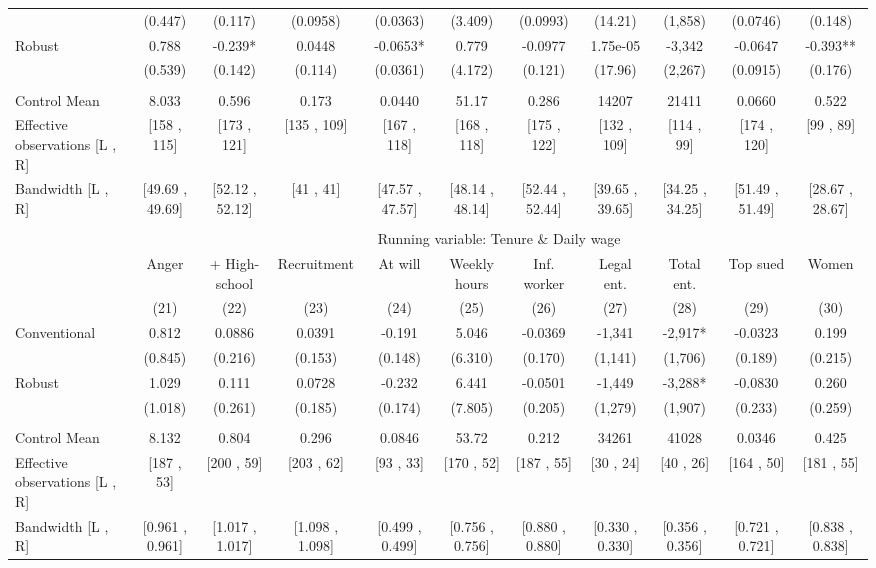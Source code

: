 \begin{tabular}{lcccccccccc}
      & (0.447) & (0.117) & (0.0958) & (0.0363) & (3.409) & (0.0993) & (14.21) & (1,858) & (0.0746) & (0.148) \\
Robust & 0.788 & -0.239* & 0.0448 & -0.0653* & 0.779 & -0.0977 & 1.75e-05 & -3,342 & -0.0647 & -0.393** \\
      & (0.539) & (0.142) & (0.114) & (0.0361) & (4.172) & (0.121) & (17.96) & (2,267) & (0.0915) & (0.176) \\
      &       &       &       &       &       &       &       &       &       &  \\
\midrule
Control Mean & 8.033 & 0.596 & 0.173 & 0.0440 & 51.17 & 0.286 & 14207 & 21411 & 0.0660 & 0.522 \\
Effective observations [L , R] & [158 , 115] & [173 , 121] & [135 , 109] & [167 , 118] & [168 , 118] & [175 , 122] & [132 , 109] & [114 , 99] & [174 , 120] & [99 , 89] \\
Bandwidth [L , R] & [49.69 , 49.69] & [52.12 , 52.12] & [41 , 41] & [47.57 , 47.57] & [48.14 , 48.14] & [52.44 , 52.44] & [39.65 , 39.65] & [34.25 , 34.25] & [51.49 , 51.49] & [28.67 , 28.67] \\
\midrule
\midrule
      &       &       &       &       &       &       &       &       &       &  \\
\midrule
      & \multicolumn{10}{c}{Running variable: Tenure \& Daily wage} \\
\midrule
      & Anger & + High-school & Recruitment & At will  & Weekly hours & Inf. worker & Legal ent. & Total ent. & Top sued & Women \\
\midrule
      & (21)  & (22)  & (23)  & (24)  & (25)  & (26)  & (27)  & (28)  & (29)  & (30) \\
\midrule
\midrule
Conventional & 0.812 & 0.0886 & 0.0391 & -0.191 & 5.046 & -0.0369 & -1,341 & -2,917* & -0.0323 & 0.199 \\
      & (0.845) & (0.216) & (0.153) & (0.148) & (6.310) & (0.170) & (1,141) & (1,706) & (0.189) & (0.215) \\
Robust & 1.029 & 0.111 & 0.0728 & -0.232 & 6.441 & -0.0501 & -1,449 & -3,288* & -0.0830 & 0.260 \\
      & (1.018) & (0.261) & (0.185) & (0.174) & (7.805) & (0.205) & (1,279) & (1,907) & (0.233) & (0.259) \\
      &       &       &       &       &       &       &       &       &       &  \\
\midrule
Control Mean & 8.132 & 0.804 & 0.296 & 0.0846 & 53.72 & 0.212 & 34261 & 41028 & 0.0346 & 0.425 \\
Effective observations [L , R] & [187 , 53] & [200 , 59] & [203 , 62] & [93 , 33] & [170 , 52] & [187 , 55] & [30 , 24] & [40 , 26] & [164 , 50] & [181 , 55] \\
Bandwidth [L , R] & [0.961 , 0.961] & [1.017 , 1.017] & [1.098 , 1.098] & [0.499 , 0.499] & [0.756 , 0.756] & [0.880 , 0.880] & [0.330 , 0.330] & [0.356 , 0.356] & [0.721 , 0.721] & [0.838 , 0.838] \\
\bottomrule
\bottomrule
\end{tabular}%
